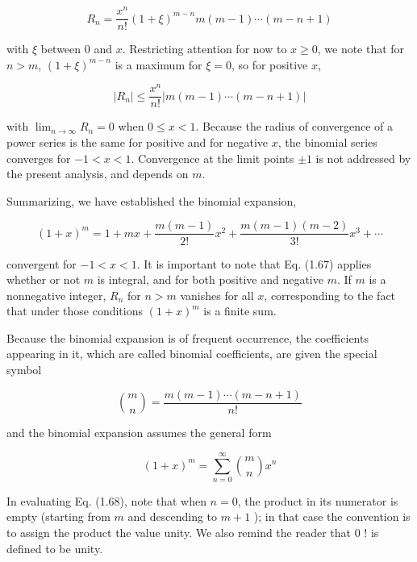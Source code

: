 \documentclass[10pt]{article}
\begin{document}
\begin{equation*}
R_{n}=\frac{x^{n}}{n!}(1+\xi)^{m-n} m(m-1) \cdots(m-n+1) \tag{1.65}
\end{equation*}


with $\xi$ between 0 and $x$. Restricting attention for now to $x \geq 0$, we note that for $n>m$, $(1+\xi)^{m-n}$ is a maximum for $\xi=0$, so for positive $x$,


\begin{equation*}
\left|R_{n}\right| \leq \frac{x^{n}}{n!}|m(m-1) \cdots(m-n+1)| \tag{1.66}
\end{equation*}


with $\lim _{n \rightarrow \infty} R_{n}=0$ when $0 \leq x<1$. Because the radius of convergence of a power series is the same for positive and for negative $x$, the binomial series converges for $-1<x<1$. Convergence at the limit points $\pm 1$ is not addressed by the present analysis, and depends on $m$.

Summarizing, we have established the binomial expansion,


\begin{equation*}
(1+x)^{m}=1+m x+\frac{m(m-1)}{2!} x^{2}+\frac{m(m-1)(m-2)}{3!} x^{3}+\cdots \tag{1.67}
\end{equation*}


convergent for $-1<x<1$. It is important to note that Eq. (1.67) applies whether or not $m$ is integral, and for both positive and negative $m$. If $m$ is a nonnegative integer, $R_{n}$ for $n>m$ vanishes for all $x$, corresponding to the fact that under those conditions $(1+x)^{m}$ is a finite sum.

Because the binomial expansion is of frequent occurrence, the coefficients appearing in it, which are called binomial coefficients, are given the special symbol


\begin{equation*}
\binom{m}{n}=\frac{m(m-1) \cdots(m-n+1)}{n!} \tag{1.68}
\end{equation*}


and the binomial expansion assumes the general form


\begin{equation*}
(1+x)^{m}=\sum_{n=0}^{\infty}\binom{m}{n} x^{n} \tag{1.69}
\end{equation*}


In evaluating Eq. (1.68), note that when $n=0$, the product in its numerator is empty (starting from $m$ and descending to $m+1$ ); in that case the convention is to assign the product the value unity. We also remind the reader that 0 ! is defined to be unity.
\end{document}
